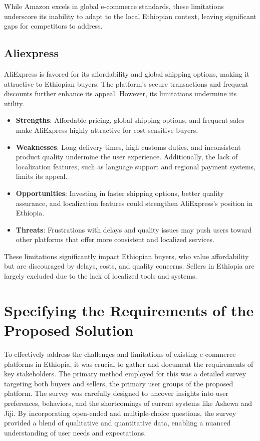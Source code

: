 \documentclass[12pt]{report}
\begin{document}
While Amazon excels in global e-commerce standards, these limitations underscore its
inability to adapt to the local Ethiopian context, leaving significant gaps for competitors to
address.

\subsection*{Aliexpress}

AliExpress is favored for its affordability and global shipping options, making it attractive to
Ethiopian buyers. The platform’s secure transactions and frequent discounts further enhance
its appeal. However, its limitations undermine its utility.

\begin{itemize}
	\item \textbf{Strengths}: Affordable pricing, global shipping options, and frequent sales make
	      AliExpress highly attractive for cost-sensitive buyers.
	\item \textbf{Weaknesses}: Long delivery times, high customs duties, and inconsistent product
	      quality undermine the user experience. Additionally, the lack of localization features,
	      such as language support and regional payment systems, limits its appeal.
	\item \textbf{Opportunities}: Investing in faster shipping options, better quality assurance, and
	      localization features could strengthen AliExpress’s position in Ethiopia.
	\item \textbf{Threats}: Frustrations with delays and quality issues may push users toward other
	      platforms that offer more consistent and localized services.
\end{itemize}

These limitations significantly impact Ethiopian buyers, who value affordability but are
discouraged by delays, costs, and quality concerns. Sellers in Ethiopia are largely excluded
due to the lack of localized tools and systems.

\section{Specifying the Requirements of the Proposed Solution}

To effectively address the challenges and limitations of existing e-commerce platforms in
Ethiopia, it was crucial to gather and document the requirements of key stakeholders. The
primary method employed for this was a detailed survey targeting both buyers and sellers, the
primary user groups of the proposed platform. The survey was carefully designed to uncover
insights into user preferences, behaviors, and the shortcomings of current systems like
Ashewa and Jiji. By incorporating open-ended and multiple-choice questions, the survey
provided a blend of qualitative and quantitative data, enabling a nuanced understanding of
user needs and expectations.
\end{document}
